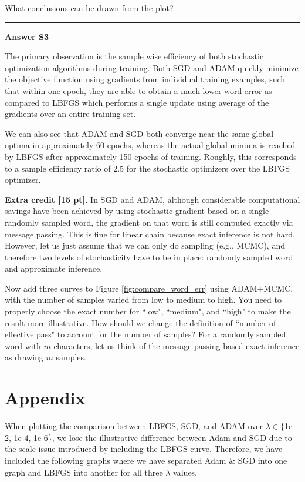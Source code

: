 \documentclass[11pt]{report}
\begin{document}
What conclusions can be drawn from the plot?


\rule{\paperwidth}{0.6pt}
{\bf Answer S3}

The primary observation is the sample wise efficiency of both stochastic optimization algorithms during training. Both SGD and ADAM quickly minimize the objective function using gradients from individual training examples, such that within one epoch, they are able to obtain a much lower word error as compared to LBFGS which performs a single update using average of the gradients over an entire training set.

We can also see that ADAM and SGD both converge near the same global optima in approximately 60 epochs, whereas the actual global minima is reached by LBFGS after approximately 150 epochs of training. Roughly, this corresponds to a sample efficiency ratio of 2.5 for the stochastic optimizers over the LBFGS optimizer.

{\bf Extra credit [15 pt].} 
In SGD and ADAM, although considerable computational savings have been achieved by using stochastic gradient based on a single randomly sampled word,
the gradient on that word is still computed exactly via message passing.
This is fine for linear chain because exact inference is not hard.
However, let us just assume that we can only do sampling (e.g., MCMC),
and therefore two levels of stochasticity have to be in place: 
randomly sampled word and approximate inference.

Now add three curves to Figure \ref{fig:compare_word_err} using ADAM+MCMC,
with the number of samples varied from low to medium to high.
You need to properly choose the exact number for ``low", ``medium", and ``high" to make the result more illustrative.
How should we change the definition of ``number of effective pass" to account for the number of samples?
For a randomly sampled word with $m$ characters, 
let us think of the message-passing based exact inference as drawing $m$ samples.

\section{Appendix}

When plotting the comparison between LBFGS, SGD, and ADAM over $\lambda \in \{${\sf 1e-2, 1e-4, 1e-6}\}, we lose the illustrative difference between Adam and SGD due to the scale issue introduced by including the LBFGS curve. Therefore, we have included the following graphs where we have separated Adam \& SGD into one graph and LBFGS into another for all three $\lambda$ values.
\end{document}
